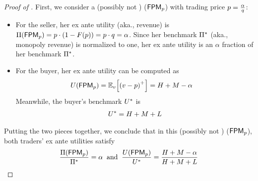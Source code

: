 \begin{proof}[Proof of ]
    First, we consider a (possibly not {\ksfair}) {\FixPrice} ({${\sf FPM}_{p}$}) with trading price $p = \frac{\alpha}{q}$:
    \begin{itemize}
        \item For the seller, her ex ante utility (aka., revenue) is $\Pi({\sf FPM}_{p}) = p\cdot (1 - F(p)) = p\cdot q = \alpha$. Since her benchmark $\Pi^*$ (aka., monopoly revenue) is normalized to one, her ex ante utility is an $\alpha$ fraction of her benchmark $\Pi^*$.
        \item For the buyer, her ex ante utility can be computed as 
        \begin{align*}
            \buyerexanteutil(\FPM_{\price}) &= 
            \expect[\val]{\plus{\val - \price}} = 
            H + M - \revratio
        \end{align*}
        Meanwhile, the buyer's benchmark $U^*$ is 
        \begin{align*}
            U^* = H + M + L
        \end{align*}
    \end{itemize}
    Putting the two pieces together, we conclude that in this (possibly not {\ksfair}) {\FixPrice} ({${\sf FPM}_{p}$}), both traders' ex ante utilities satisfy
    \begin{align*}
        \frac{\Pi({\sf FPM}_{p})}{\Pi^*} = \alpha
        \;\;
        \mbox{and}
        \;\;
        \frac{U({\sf FPM}_{p})}{U^*} = \frac{H + M - \alpha}{H + M + L}
    \end{align*}
    

\end{proof}

